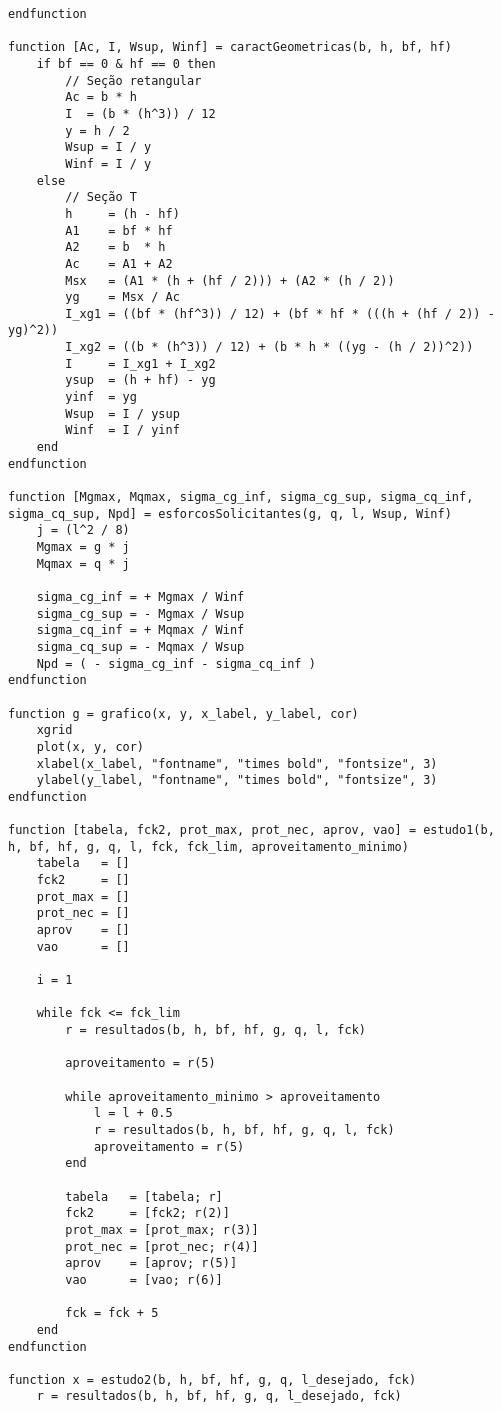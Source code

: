 \documentclass[
	12pt,				%
	openright,			%
	oneside,			%
	a4paper,			%
	chapter=TITLE,		%
	english,			%
	french,				%
	spanish,			%
	brazil				%
	]{abntex2}
\begin{document}
\begin{apendicesenv}
\begin{lstlisting}
endfunction

function [Ac, I, Wsup, Winf] = caractGeometricas(b, h, bf, hf)
    if bf == 0 & hf == 0 then
        // Seção retangular
        Ac = b * h
        I  = (b * (h^3)) / 12
        y = h / 2
        Wsup = I / y
        Winf = I / y
    else
        // Seção T
        h     = (h - hf)
        A1    = bf * hf
        A2    = b  * h
        Ac    = A1 + A2
        Msx   = (A1 * (h + (hf / 2))) + (A2 * (h / 2))
        yg    = Msx / Ac
        I_xg1 = ((bf * (hf^3)) / 12) + (bf * hf * (((h + (hf / 2)) - yg)^2))
        I_xg2 = ((b * (h^3)) / 12) + (b * h * ((yg - (h / 2))^2))
        I     = I_xg1 + I_xg2
        ysup  = (h + hf) - yg
        yinf  = yg
        Wsup  = I / ysup
        Winf  = I / yinf
    end
endfunction

function [Mgmax, Mqmax, sigma_cg_inf, sigma_cg_sup, sigma_cq_inf, sigma_cq_sup, Npd] = esforcosSolicitantes(g, q, l, Wsup, Winf)
    j = (l^2 / 8)
    Mgmax = g * j
    Mqmax = q * j
    
    sigma_cg_inf = + Mgmax / Winf
    sigma_cg_sup = - Mgmax / Wsup
    sigma_cq_inf = + Mqmax / Winf
    sigma_cq_sup = - Mqmax / Wsup
    Npd = ( - sigma_cg_inf - sigma_cq_inf )
endfunction

function g = grafico(x, y, x_label, y_label, cor)
    xgrid
    plot(x, y, cor)
    xlabel(x_label, "fontname", "times bold", "fontsize", 3)
    ylabel(y_label, "fontname", "times bold", "fontsize", 3)
endfunction

function [tabela, fck2, prot_max, prot_nec, aprov, vao] = estudo1(b, h, bf, hf, g, q, l, fck, fck_lim, aproveitamento_minimo)
    tabela   = []
    fck2     = []
    prot_max = []
    prot_nec = []
    aprov    = []
    vao      = []

    i = 1

    while fck <= fck_lim
        r = resultados(b, h, bf, hf, g, q, l, fck)

        aproveitamento = r(5)

        while aproveitamento_minimo > aproveitamento
            l = l + 0.5
            r = resultados(b, h, bf, hf, g, q, l, fck)
            aproveitamento = r(5)
        end

        tabela   = [tabela; r]
        fck2     = [fck2; r(2)]
        prot_max = [prot_max; r(3)]
        prot_nec = [prot_nec; r(4)]
        aprov    = [aprov; r(5)]
        vao      = [vao; r(6)]

        fck = fck + 5
    end
endfunction

function x = estudo2(b, h, bf, hf, g, q, l_desejado, fck)
    r = resultados(b, h, bf, hf, g, q, l_desejado, fck)


\end{lstlisting}
\end{apendicesenv}
\end{document}
